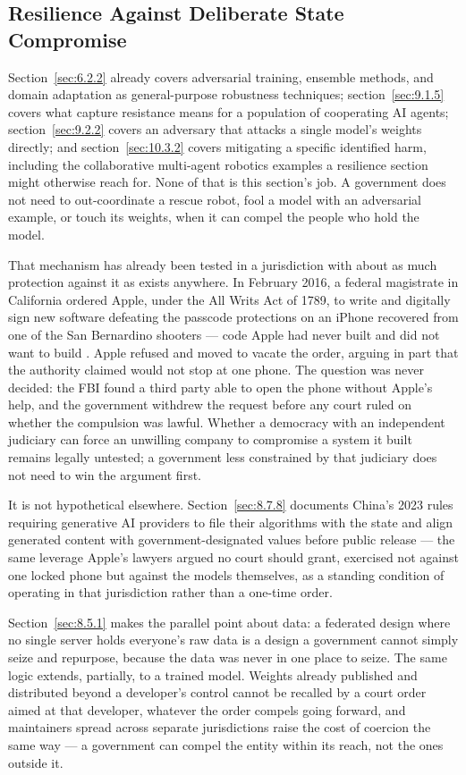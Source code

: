 \subsection{Resilience Against Deliberate State Compromise}
\label{sec:10.3.3}
Section~\ref{sec:6.2.2} already covers adversarial training, ensemble methods, and domain adaptation as general-purpose robustness techniques; section~\ref{sec:9.1.5} covers what capture resistance means for a population of cooperating AI agents; section~\ref{sec:9.2.2} covers an adversary that attacks a single model's weights directly; and section~\ref{sec:10.3.2} covers mitigating a specific identified harm, including the collaborative multi-agent robotics examples a resilience section might otherwise reach for. None of that is this section's job. A government does not need to out-coordinate a rescue robot, fool a model with an adversarial example, or touch its weights, when it can compel the people who hold the model.

That mechanism has already been tested in a jurisdiction with about as much protection against it as exists anywhere. In February 2016, a federal magistrate in California ordered Apple, under the All Writs Act of 1789, to write and digitally sign new software defeating the passcode protections on an iPhone recovered from one of the San Bernardino shooters — code Apple had never built and did not want to build \autocite{pym2016applefbi}. Apple refused and moved to vacate the order, arguing in part that the authority claimed would not stop at one phone. The question was never decided: the FBI found a third party able to open the phone without Apple's help, and the government withdrew the request before any court ruled on whether the compulsion was lawful. Whether a democracy with an independent judiciary can force an unwilling company to compromise a system it built remains legally untested; a government less constrained by that judiciary does not need to win the argument first.

It is not hypothetical elsewhere. Section~\ref{sec:8.7.8} documents China's 2023 rules requiring generative AI providers to file their algorithms with the state and align generated content with government-designated values before public release — the same leverage Apple's lawyers argued no court should grant, exercised not against one locked phone but against the models themselves, as a standing condition of operating in that jurisdiction rather than a one-time order.

Section~\ref{sec:8.5.1} makes the parallel point about data: a federated design where no single server holds everyone's raw data is a design a government cannot simply seize and repurpose, because the data was never in one place to seize. The same logic extends, partially, to a trained model. Weights already published and distributed beyond a developer's control cannot be recalled by a court order aimed at that developer, whatever the order compels going forward, and maintainers spread across separate jurisdictions raise the cost of coercion the same way — a government can compel the entity within its reach, not the ones outside it.

